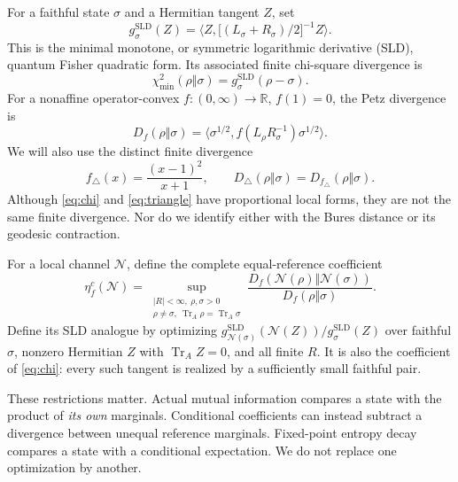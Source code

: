 \documentclass[11pt]{article}
\newcommand{\Tr}{\operatorname{Tr}}
\newcommand{\N}{\mathcal N}
\newcommand{\ip}[2]{\langle #1,#2\rangle}
\newcommand{\Dtri}{D_{\triangle}}
\newcommand{\gmin}{g^{\mathrm{SLD}}}
\theoremstyle{remark}
\begin{document}
For a faithful state \(\sigma\) and a Hermitian tangent \(Z\), set
\begin{equation}\label{eq:sld}
 \gmin_\sigma(Z)=
 \ip{Z}{\bigl[(L_\sigma+R_\sigma)/2\bigr]^{-1}Z}.
\end{equation}
This is the minimal monotone, or symmetric logarithmic derivative (SLD), quantum Fisher quadratic form. Its associated finite chi-square divergence is
\begin{equation}\label{eq:chi}
 \chi^2_{\min}(\rho\Vert\sigma)=\gmin_\sigma(\rho-\sigma).
\end{equation}
For a nonaffine operator-convex \(f:(0,\infty)\to\mathbb R\), \(f(1)=0\), the Petz divergence is
\begin{equation}\label{eq:petz}
 D_f(\rho\Vert\sigma)=
 \ip{\sigma^{1/2}}{f(L_\rho R_\sigma^{-1})\sigma^{1/2}}.
\end{equation}
We will also use the distinct finite divergence
\begin{equation}\label{eq:triangle}
 f_\triangle(x)=\frac{(x-1)^2}{x+1},\qquad
 \Dtri(\rho\Vert\sigma)=D_{f_\triangle}(\rho\Vert\sigma).
\end{equation}
Although \eqref{eq:chi} and \eqref{eq:triangle} have proportional local forms, they are not the same finite divergence. Nor do we identify either with the Bures distance or its geodesic contraction.

For a local channel \(\N\), define the complete equal-reference coefficient
\begin{equation}\label{eq:complete}
 \eta_f^c(\N)=\sup_{\substack{|R|<\infty,\ \rho,\sigma>0\\
 \rho\ne\sigma,\ \Tr_A\rho=\Tr_A\sigma}}
 \frac{D_f(\N(\rho)\Vert\N(\sigma))}
      {D_f(\rho\Vert\sigma)}.
\end{equation}
Define its SLD analogue by optimizing
\(\gmin_{\N(\sigma)}(\N(Z))/\gmin_\sigma(Z)\)
over faithful \(\sigma\), nonzero Hermitian \(Z\) with \(\Tr_AZ=0\), and all finite \(R\).
It is also the coefficient of \eqref{eq:chi}: every such tangent is realized by a sufficiently small faithful pair.

These restrictions matter. Actual mutual information compares a state with the product of \emph{its own} marginals. Conditional coefficients can instead subtract a divergence between unequal reference marginals. Fixed-point entropy decay compares a state with a conditional expectation. We do not replace one optimization by another.
\end{document}
